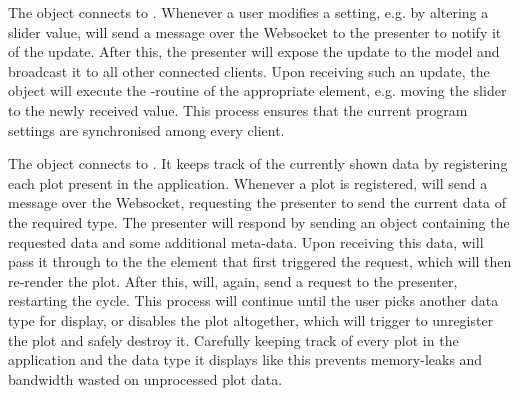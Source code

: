 \documentclass[a4paper, openany, oneside]{memoir}
\begin{document}
The  object connects to . Whenever a user modifies a setting, e.g. by altering a slider value,  will send a message over the Websocket to the presenter to notify it of the update.
After this, the presenter will expose the update to the model and broadcast it to all other connected clients. Upon receiving such an update, the  object will execute the -routine of the appropriate element, e.g. moving the slider to the newly received value. This process ensures that the current program settings are synchronised among every client.

The  object connects to . It keeps track of the currently shown data by registering each plot present in the application. Whenever a plot is registered,  will send a message over the Websocket, requesting the presenter to send the current data of the required type. The presenter will respond by sending an object containing the requested data and some additional meta-data. Upon receiving this data,  will pass it through to the the element that first triggered the request, which will then re-render the plot. After this,  will, again, send a request to the presenter, restarting the cycle. This process will continue until the user picks another data type for display, or disables the plot altogether, which will trigger  to unregister the plot and safely destroy it. Carefully keeping track of every plot in the application and the data type it displays like this prevents memory-leaks and bandwidth wasted on unprocessed plot data.
\end{document}
